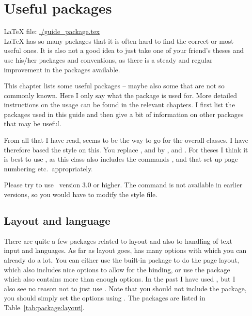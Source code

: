 
\chapter{Useful packages}
\label{sec:package}

\LaTeX{} file: \url{./guide_package.tex}\\[1ex]
\noindent
\LaTeX{} has so many packages that it is often hard to find the
correct or most useful ones. It is also not a good idea to just take
one of your friend's theses and use his/her packages and conventions,
as there is a steady and regular improvement in the packages
available.

This chapter lists some useful packages -- maybe also some that
are not so commonly known. Here I only say what the package is used
for. More detailed instructions on the usage can be found in the
relevant chapters. I first list the packages used in this guide
and then give a bit of information on other packages that may be useful.

From all that I have read, \KOMAScript{}
seems to be the way to go for the overall classes. I have therefore
based the  style on this. You replace
,  and  by
,  and . For
theses I think it is best to use , as this class also
includes the commands ,  and
 that set up page numbering etc.\ appropriately.

Please try to use \KOMAScript\ version 3.0 or higher. The
 command is not available in earlier versions, so
you would have to modify the style file.


\section{Layout and language}
\label{sec:package:layout}

There are quite a few packages related to layout and also to handling
of text input and languages. As far as layout goes, \KOMAScript{} has
many options with which you can already do a lot. You can either use
the built-in  package to do the page layout, which
also includes nice options to allow for the binding, or use the
 package which also contains more than enough
options. In the past I have used , but I also see no
reason not to just use . Note that you should not
include the  package, you should simply set the
options using .
The packages are listed in Table~\ref{tab:package:layout}.

